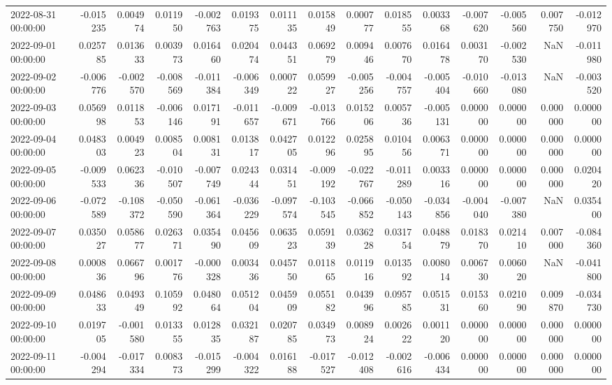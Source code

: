 \begin{tabular}{lrrrrrrrrrrrrrr}
2022-08-31 00:00:00 & -0.015235 & 0.004974 & 0.011950 & -0.002763 & 0.019375 & 0.011135 & 0.015849 & 0.000777 & 0.018555 & 0.003368 & -0.007620 & -0.005560 & 0.007750 & -0.012970 \\
2022-09-01 00:00:00 & 0.025785 & 0.013633 & 0.003973 & 0.016460 & 0.020474 & 0.044351 & 0.069279 & 0.009446 & 0.007670 & 0.016478 & 0.003170 & -0.002530 & NaN & -0.011980 \\
2022-09-02 00:00:00 & -0.006776 & -0.002570 & -0.008569 & -0.011384 & -0.006349 & 0.000722 & 0.059927 & -0.005256 & -0.004757 & -0.005404 & -0.010660 & -0.013080 & NaN & -0.003520 \\
2022-09-03 00:00:00 & 0.056998 & 0.011853 & -0.006146 & 0.017191 & -0.011657 & -0.009671 & -0.013766 & 0.015206 & 0.005736 & -0.005131 & 0.000000 & 0.000000 & 0.000000 & 0.000000 \\
2022-09-04 00:00:00 & 0.048303 & 0.004923 & 0.008504 & 0.008131 & 0.013817 & 0.042705 & 0.012296 & 0.025895 & 0.010456 & 0.006371 & 0.000000 & 0.000000 & 0.000000 & 0.000000 \\
2022-09-05 00:00:00 & -0.009533 & 0.062336 & -0.010507 & -0.007749 & 0.024344 & 0.031451 & -0.009192 & -0.022767 & -0.011289 & 0.003316 & 0.000000 & 0.000000 & 0.000000 & 0.020420 \\
2022-09-06 00:00:00 & -0.072589 & -0.108372 & -0.050590 & -0.061364 & -0.036229 & -0.097574 & -0.103545 & -0.066852 & -0.050143 & -0.034856 & -0.004040 & -0.007380 & NaN & 0.035400 \\
2022-09-07 00:00:00 & 0.035027 & 0.058677 & 0.026371 & 0.035490 & 0.045609 & 0.063523 & 0.059139 & 0.036228 & 0.031754 & 0.048879 & 0.018370 & 0.021410 & 0.007000 & -0.084360 \\
2022-09-08 00:00:00 & 0.000836 & 0.066796 & 0.001776 & -0.000328 & 0.003436 & 0.045750 & 0.011865 & 0.011916 & 0.013592 & 0.008014 & 0.006730 & 0.006020 & NaN & -0.041800 \\
2022-09-09 00:00:00 & 0.048633 & 0.049349 & 0.105992 & 0.048064 & 0.051204 & 0.045909 & 0.055182 & 0.043996 & 0.095785 & 0.051531 & 0.015360 & 0.021090 & 0.009870 & -0.034730 \\
2022-09-10 00:00:00 & 0.019705 & -0.001580 & 0.013355 & 0.012835 & 0.032187 & 0.020785 & 0.034973 & 0.008924 & 0.002622 & 0.001120 & 0.000000 & 0.000000 & 0.000000 & 0.000000 \\
2022-09-11 00:00:00 & -0.004294 & -0.017334 & 0.008373 & -0.015299 & -0.004322 & 0.016188 & -0.017527 & -0.012408 & -0.002616 & -0.006434 & 0.000000 & 0.000000 & 0.000000 & 0.000000 \\

\end{tabular}
